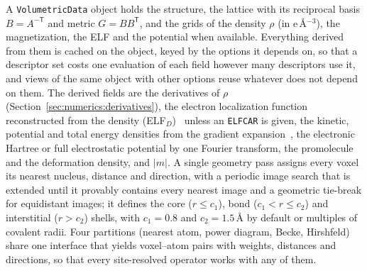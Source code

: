 \documentclass[11pt,a4paper]{article}
\begin{document}
A \texttt{VolumetricData} object holds the structure, the lattice with its
reciprocal basis $B=A^{-\mathsf T}$ and metric $G=BB^{\mathsf T}$, and the
grids of the density $\rho$ (in e\,\AA$^{-3}$), the magnetization, the ELF and
the potential when available. Everything derived from them is cached on the
object, keyed by the options it depends on, so that a descriptor set costs one
evaluation of each field however many descriptors use it, and views of the
same object with other options reuse whatever does not depend on them. The
derived fields are the derivatives of $\rho$ (Section~\ref{sec:numerics:derivatives}),
the electron localization function~\cite{becke1990} reconstructed from the
density (ELF$_D$)~\cite{tsirelson2002} unless an \texttt{ELFCAR} is given, the kinetic,
potential and total energy densities from the gradient
expansion~\cite{abramov1997}, the electronic Hartree or full electrostatic
potential by one Fourier transform, the promolecule and the deformation
density, and $|m|$. A single geometry pass assigns every voxel its nearest
nucleus, distance and direction, with a periodic image search that is extended
until it provably contains every nearest image and a geometric tie-break for
equidistant images; it defines the core ($r\leq c_1$), bond
($c_1<r\leq c_2$) and interstitial ($r>c_2$) shells, with $c_1=0.8$ and
$c_2=1.5$\,\AA{} by default or multiples of covalent radii. Four partitions
(nearest atom, power diagram, Becke, Hirshfeld) share one interface that
yields voxel--atom pairs with weights, distances and directions, so that every
site-resolved operator works with any of them.
\end{document}
